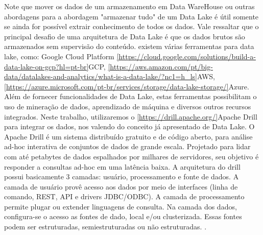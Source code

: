 Note que mover os dados de um armazenamento em Data WareHouse ou outras abordagens para a abordagem "armazenar tudo" de um  Data Lake é útil somente se ainda for possível extrair conhecimento de todos os dados.
Vale ressaltar que o principal desafio de uma arquitetura de Data Lake é que os dados brutos são armazenados sem supervisão do conteúdo.
existem várias ferramentas para data lake, como: Google Cloud Platform \ref{https://cloud.google.com/solutions/build-a-data-lake-on-gcp?hl=pt-br}{GCP}, \ref{https://aws.amazon.com/pt/big-data/datalakes-and-analytics/what-is-a-data-lake/?nc1=h_ls}{AWS}, \ref{https://azure.microsoft.com/pt-br/services/storage/data-lake-storage/}{Azure}.  Além de fornecer funcionalidades de Data Lake, estas ferramentas possibilitam o uso de mineração de dados, aprendizado de máquina e diversos outros recursos integrados.
Neste trabalho, utilizaremos o \ref{https://drill.apache.org/}{Apache Drill} para integrar os dados, nos valendo do conceito já apresentado de Data Lake.
O Apache Drill é um sistema distribuído gratuito e de código aberto, para análise ad-hoc interativa de conjuntos de dados de grande escala. Projetado para lidar com até
petabytes de dados espalhados por milhares de servidores, seu objetivo é responder a consultas ad-hoc em uma latência baixa.
A arquitetura do drill possui basicamente 3 camadas: usuário, processamento e fonte de dados.
A camada de usuário provê acesso aos dados por meio de interfaces (linha de comando, REST, API e drivers JDBC/ODBC). A camada de processamento permite plugar ou extender linguagens de consulta. Na camada dos dados, configura-se  o acesso as fontes de dado, local e/ou clusterizada. Essas fontes podem ser estruturadas, semiestruturadas ou não estruturadas. \cite{hausenblas2013apache}.